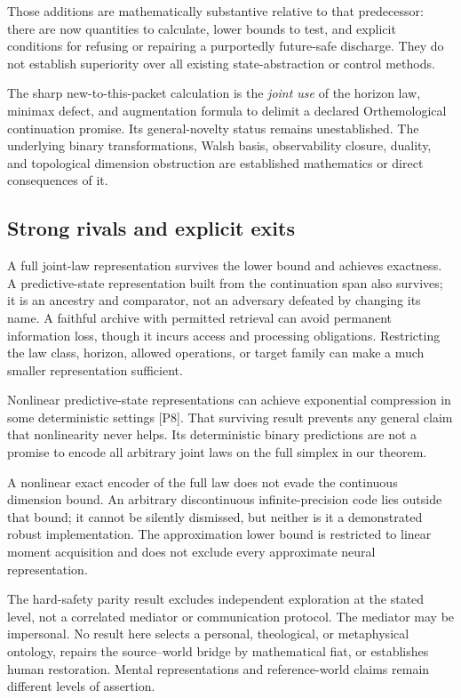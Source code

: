 \documentclass[11pt,a4paper]{article}
\begin{document}
Those additions are mathematically substantive relative to that
predecessor: there are now quantities to calculate, lower bounds to
test, and explicit conditions for refusing or repairing a purportedly
future-safe discharge. They do not establish superiority over all
existing state-abstraction or control methods.

The sharp new-to-this-packet calculation is the \emph{joint use} of the
horizon law, minimax defect, and augmentation formula to delimit a
declared Orthemological continuation promise. Its general-novelty status
remains unestablished. The underlying binary transformations, Walsh
basis, observability closure, duality, and topological dimension
obstruction are established mathematics or direct consequences of it.

\subsection{Strong rivals and explicit
exits}\label{strong-rivals-and-explicit-exits}

A full joint-law representation survives the lower bound and achieves
exactness. A predictive-state representation built from the continuation
span also survives; it is an ancestry and comparator, not an adversary
defeated by changing its name. A faithful archive with permitted
retrieval can avoid permanent information loss, though it incurs access
and processing obligations. Restricting the law class, horizon, allowed
operations, or target family can make a much smaller representation
sufficient.

Nonlinear predictive-state representations can achieve exponential
compression in some deterministic settings {[}P8{]}. That surviving
result prevents any general claim that nonlinearity never helps. Its
deterministic binary predictions are not a promise to encode all
arbitrary joint laws on the full simplex in our theorem.

A nonlinear exact encoder of the full law does not evade the continuous
dimension bound. An arbitrary discontinuous infinite-precision code lies
outside that bound; it cannot be silently dismissed, but neither is it a
demonstrated robust implementation. The approximation lower bound is
restricted to linear moment acquisition and does not exclude every
approximate neural representation.

The hard-safety parity result excludes independent exploration at the
stated level, not a correlated mediator or communication protocol. The
mediator may be impersonal. No result here selects a personal,
theological, or metaphysical ontology, repairs the source--world bridge
by mathematical fiat, or establishes human restoration. Mental
representations and reference-world claims remain different levels of
assertion.
\end{document}
